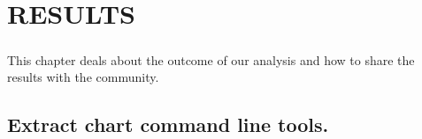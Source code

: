 \chapter{\normalsize{RESULTS}}
\paragraph{}
This chapter deals about the outcome of our analysis and how to share the results with the community.
\section{Extract chart command line tools.}
